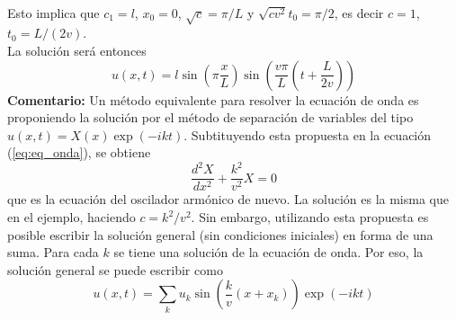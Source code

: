 \\
Esto implica que $c_{1} = l$, $x_{0} = 0$, $\sqrt{c} = \pi/L$ y $\sqrt{cv^{2}}t_{0} = \pi/2$, es decir $c = 1$, $t_{0} = L/(2v)$.
\\
La solución será entonces
\begin{equation}
u(x,t) = l \sin \left( \pi \dfrac{x}{L} \right) \sin \left( \dfrac{v \pi}{L} \left( t + \dfrac{L}{2v} \right) \right)
\end{equation}
\textbf{Comentario:} Un método equivalente para resolver la ecuación de onda es proponiendo la solución por el método de separación de variables del tipo $u(x,t) = X(x) \exp(-ikt)$. Subtituyendo esta propuesta en la ecuación (\ref{eq:eq_onda}), se obtiene
\begin{equation}
\dfrac{d^{2} X }{d x^{2}} + \dfrac{k^{2}}{v^{2}}X = 0
\end{equation}
que es la ecuación del oscilador armónico de nuevo. La solución es la misma que en el ejemplo, haciendo $c = k^{2}/v^{2}$. Sin embargo, utilizando esta propuesta es posible escribir la solución general (sin condiciones iniciales) en forma de una suma. Para cada $k$ se tiene una solución de la ecuación de onda. Por eso, la solución general se puede escribir como
\begin{equation}
u(x,t) = \sum_{k} u_{k} \sin \left( \dfrac{k}{v} ( x + x_{k}) \right) \exp(-ikt)
\end{equation}
